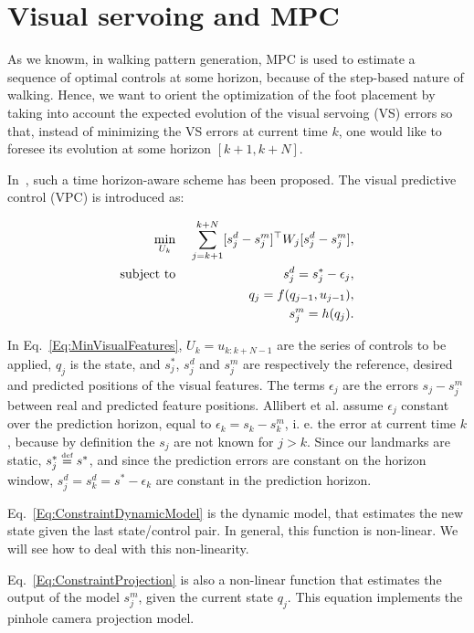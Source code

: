 \section{Visual servoing and MPC}
\label{sec:vs}

As we knowm, in walking pattern generation, MPC is used to estimate a sequence of optimal controls at some horizon, because of the step-based nature of walking. Hence, we want to orient the optimization of the foot placement by taking into account the expected evolution of the visual servoing (VS) errors so that, instead of minimizing the VS errors at current time $k$, one would like to foresee its evolution at some horizon $[k+1,k+N]$. 

In~\citep{Allibert2010}, such a time horizon-aware scheme has been proposed. The visual predictive control (VPC) is introduced as:

\begin{eqnarray}
\label{Eq:MinVisualFeatures}
 \min_{U_{k}} \;&& \sum\limits_{j=k+1}^{k+N} [s^d_j - s^m_j]^{\top} W_j [s^d_j - s^m_j], \\
 \mbox{subject to} \; && s^d_j = s^{*}_j - \epsilon_j, \\
 \label{Eq:ConstraintDynamicModel}
 && q_j = f(q_{j-1},u_{j-1}), \\
 \label{Eq:ConstraintProjection}
 && s^m_j = h(q_j).
\end{eqnarray}

In Eq.~\ref{Eq:MinVisualFeatures}, $U_{k}=u_{k:k+N-1}$ are the series of controls to be applied, $q_j$ is the state, and $s^*_j$, $s^d_j$ and $s^m_j$ are respectively the reference, desired and predicted positions of the visual features. The terms $\epsilon_j$ are the errors $s_j-s^m_j$ between real and predicted feature positions.
Allibert et al. assume $\epsilon_j$ constant over the prediction horizon, equal to $\epsilon_k=s_k-s^m_k$, i. e. the error at current time $k$, because by definition the $s_j$ are not known for $j>k$.
Since our landmarks are static, $s^*_j \stackrel{\mbox{\tiny def}}{=} s^*$, and since the prediction errors are constant on the horizon window, $s^d_j=s^d_k=s^*-\epsilon_k$ are constant in the prediction horizon.

Eq.~\ref{Eq:ConstraintDynamicModel} is the dynamic model, that estimates the new state given the last state/control pair. In general, this function is non-linear. We will see how to deal with this non-linearity.

Eq.~\ref{Eq:ConstraintProjection} is also a non-linear function that estimates the output of the model $s^m_j$, given the current state $q_j$. This equation implements the pinhole camera projection model.

